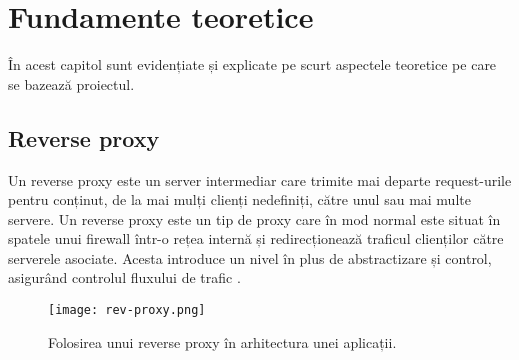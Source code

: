 \chapter{Fundamente teoretice}
\label{cap:fund-teoretice}


 În acest capitol sunt evidențiate și explicate pe scurt aspectele teoretice pe care se bazează proiectul. 

%
%
%
%
\section{Reverse proxy}

Un reverse proxy este un server intermediar care trimite mai departe request-urile pentru conținut, de la mai mulți clienți nedefiniți, către unul sau mai multe servere. Un reverse proxy este un tip de proxy care în mod normal este situat în spatele unui firewall într-o rețea internă și redirecționează traficul clienților către serverele asociate. Acesta introduce un nivel în plus de abstractizare și control, asigurând controlul fluxului de trafic  \cite{rev_proxy_server}.

\begin{figure}[h]
	\centering
	\texttt{[image: rev-proxy.png]}
	\caption{ Folosirea unui reverse proxy în arhitectura unei aplicații.}
	\label{fig:rev-proxy}
\end{figure}

